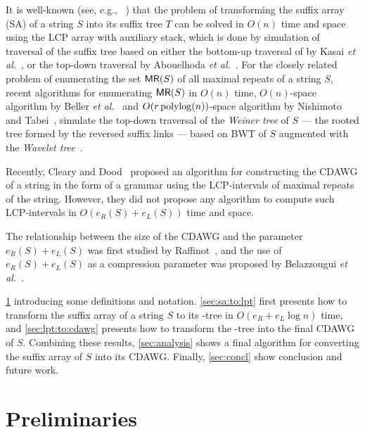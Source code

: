 It is well-known (see, e.g., ~\cite{crochemore2021book125problems:chap:satostree}) that the problem of transforming the suffix array (SA) of a string $S$ into its suffix tree $T$ can be solved in $O(n)$ time and space using the LCP array with auxiliary stack, which is done by simulation of traversal of the suffix tree based on either the bottom-up traversal of by Kasai \textit{et al.}~\cite{kasai:lee2001lcp:linear},
or the top-down traversal by Abouelhoda \textit{et al.}~\cite{abouelhoda2004replacing}.
For the closely related problem of enumerating the set $\textsf{MR}(S)$ of all maximal repeats of a string $S$, recent algorithms for enumerating $\textsf{MR}(S)$ in $O(n)$ time, $O(n)$-space algorithm by Beller \textit{et al.}~\cite{beller:berger2012space:efficient:bbo} and $O(r\operatorname{\mathrm{polylog}}(n))$-space algorithm by Nishimoto and Tabei~\cite{nishimoto:cpm2021enum}, simulate the top-down traversal of the \textit{Weiner tree} of $S$ --- the rooted tree formed by the reversed suffix links ---  based on BWT of $S$ augmented with the \textit{Wavelet tree}~\cite{grossi2003high}.

Recently, Cleary and Dood~\cite{cleary2023constructing} proposed an algorithm for constructing the CDAWG of a string in the form of a grammar using the LCP-intervals of maximal repeats of the string. However, they did not propose any algorithm to compute such LCP-intervals in $O(e_R(S) + e_L(S))$ time and space.

The relationship between the size of the CDAWG and the parameter ${e_R(S) + e_L(S)}$ was first studied by Raffinot~\cite{raffinot2001maximal}, and the use of ${e_R(S) + e_L(S)}$ as a compression parameter was proposed by Belazzougui \textit{et al.}~\cite{belazzougui:nunial:gagie:prezza:raffinot2015composite}.

\cref{sec:prelim} introducing some definitions and notation. 
\cref{sec:sa:to:lpt} first presents how to transform the suffix array of a string $S$ to its \LPTrm-tree in $O(e_R + e_L\log n)$ time, and  
\cref{sec:lpt:to:cdawg} presents how to transform the \LPTrm-tree into the final CDAWG of $S$. Combining these results, \cref{sec:analysis} shows a final algorithm for converting the suffix array of $S$ into its CDAWG. 
Finally, \cref{sec:concl} show conclusion and future work.

\section{Preliminaries}
\label{sec:prelim}

